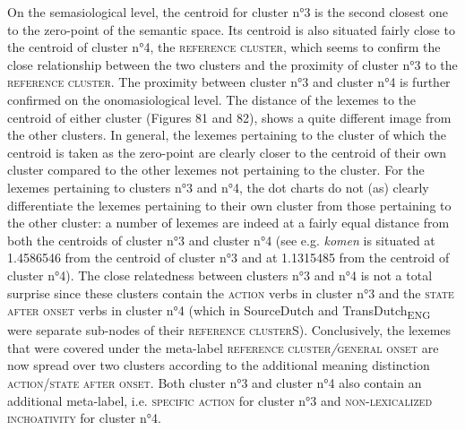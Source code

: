 On the semasiological level, the centroid for cluster n°3 is the second closest one to the zero-point of the semantic space. Its centroid is also situated fairly close to the centroid of cluster n°4, the \textsc{reference cluster}, which seems to confirm the close relationship between the two clusters and the proximity of cluster n°3 to the \textsc{reference cluster}. The proximity between cluster n°3 and cluster n°4 is further confirmed on the onomasiological level. The distance of the lexemes to the centroid of either cluster (Figures 81 and 82), shows a quite different image from the other clusters. In general, the lexemes pertaining to the cluster of which the centroid is taken as the zero-point are clearly closer to the centroid of their own cluster compared to the other lexemes not pertaining to the cluster. For the lexemes pertaining to clusters n°3 and n°4, the dot charts do not (as) clearly differentiate the lexemes pertaining to their own cluster from those pertaining to the other cluster: a number of lexemes are indeed at a fairly equal distance from both the centroids of cluster n°3 and cluster n°4 (see e.g. \textit{komen} is situated at 1.4586546 from the centroid of cluster n°3 and at 1.1315485 from the centroid of cluster n°4). The close relatedness between clusters n°3 and n°4 is not a total surprise since these clusters contain the \textsc{action} verbs in cluster n°3 and the \textsc{state after onset} verbs in cluster n°4 (which in SourceDutch and TransDutch\textsubscript{ENG} were separate sub-nodes of their \textsc{reference cluster}S). Conclusively, the lexemes that were covered under the meta-label \textsc{reference cluster}\textit{/}\textsc{general onset} are now spread over two clusters according to the additional meaning distinction \textsc{action}\slash \textsc{state after onset}. Both cluster n°3 and cluster n°4 also contain an additional meta-label, i.e. {\textsc{specific}} \textsc{action} for cluster n°3 and {\textsc{non-lexicalized inchoativity}} for cluster n°4.

